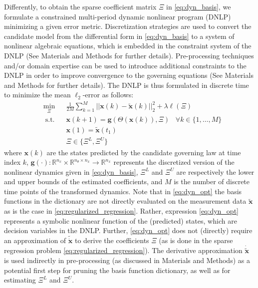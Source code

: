\documentclass[12pt]{article}
\begin{document}
Differently, to obtain the sparse coefficient matrix $\Xi$ in \eqref{eq:dyn_basis}, we formulate a constrained multi-period dynamic nonlinear program (DNLP) minimizing a given error metric. Discretization strategies are used to convert the candidate model from the differential form in \eqref{eq:dyn_basis} to a system of nonlinear algebraic equations, which is embedded in  the constraint system of  the DNLP \cite{nicholson2018pyomo} (See Materials and Methods for further details). Pre-processing techniques and/or domain expertise can be used to introduce additional constraints to the DNLP in order to improve convergence to the governing equations (See Materials and Methods for further details). The DNLP is thus formulated in discrete time to minimize the mean $\ell_2$-error as follows:
\begin{equation}
\label{eq:dyn_opt}
\begin{aligned}
& \min_{\Xi} && \frac{1}{2M} \sum_{k=1}^{M}||\textbf{x}(k)-\tilde{\textbf{x}}(k)||_2^2 + \lambda \ell(\Xi)\\
& \; \text{s.t.} && \textbf{x}({k+1}) = \textbf{g}(\Theta(\textbf{x}(k)),\Xi)  \;\;\; \forall k\in \{1,\dots,M\}\\
& \; &&\textbf{x}(1) = \tilde{\textbf{x}}(t_1) \\
& \; && \Xi \in \{ \Xi^{L}, \Xi^{U} \}
\end{aligned}
\end{equation}
where $\textbf{x}(k)$ are the states predicted by the candidate governing law at time index $k$, $\textbf{g}(\cdot):\mathbb{R}^{n_x}\times \mathbb{R}^{n_\theta \times n_x}\rightarrow\mathbb{R}^{n_x}$ represents the discretized version of the nonlinear dynamics given in \eqref{eq:dyn_basis}, $\Xi^{L}$ and $\Xi^{U}$ are respectively the lower and upper bounds of the estimated coefficients, and $M$ is the number of discrete time points of the transformed dynamics. Note that in \eqref{eq:dyn_opt} the basis functions in the dictionary are not directly evaluated on the measurement data $\tilde{\textbf{x}}$ as is the case in \eqref{eq:regularized_regression}. Rather,  expression \eqref{eq:dyn_opt} represents a symbolic nonlinear function of the (predicted) states, which are decision variables in the DNLP. Further, \eqref{eq:dyn_opt} does not (directly) require an approximation of $\tilde{\dot{\textbf{x}}}$ to derive the coefficients $\Xi$  (as is done in the sparse regression problem \eqref{eq:regularized_regression}). The derivative approximation $\dot{\tilde{\textbf{x}}}$ is used indirectly in pre-processing (as discussed in Materials and Methods) as a potential first step for pruning the basis function dictionary, as well as for estimating $\Xi^L$ and $\Xi^U$.
\end{document}
